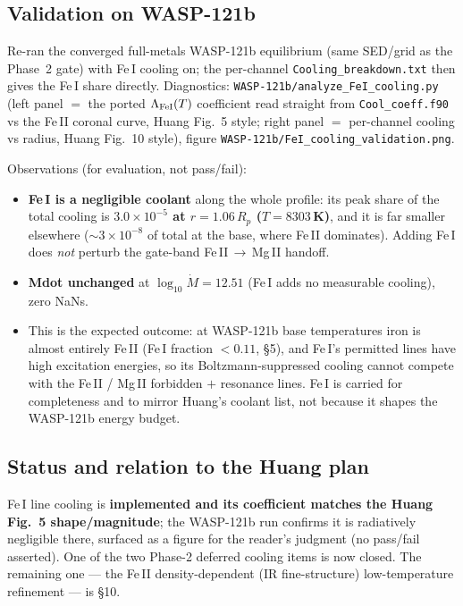 \documentclass[english,a4paper]{kiseon_memo}
\begin{document}
\subsection{Validation on WASP-121b}

Re-ran the converged full-metals WASP-121b equilibrium (same SED/grid as the
Phase~2 gate) with Fe\,I cooling on; the per-channel \texttt{Cooling\_breakdown.txt}
then gives the Fe\,I share directly. Diagnostics:
\texttt{WASP-121b/analyze\_FeI\_cooling.py} (left panel $=$ the ported
\(\Lambda_{\rm FeI}(T)\) coefficient read straight from \texttt{Cool\_coeff.f90} vs
the Fe\,II coronal curve, Huang Fig.~5 style; right panel $=$ per-channel cooling vs
radius, Huang Fig.~10 style), figure
\texttt{WASP-121b/FeI\_cooling\_validation.png}.

Observations (for evaluation, not pass/fail):
\begin{itemize}
  \item \textbf{Fe\,I is a negligible coolant} along the whole profile: its peak
    share of the total cooling is \textbf{\(3.0\times10^{-5}\) at \(r=1.06\,R_p\)
    (\(T=8303\)\,K)}, and it is far smaller elsewhere (\(\sim3\times10^{-8}\) of
    total at the base, where Fe\,II dominates). Adding Fe\,I does \emph{not} perturb
    the gate-band Fe\,II\,\(\to\)\,Mg\,II handoff.
  \item \textbf{Mdot unchanged} at \(\log_{10}\dot M = 12.51\) (Fe\,I adds no
    measurable cooling), zero NaNs.
  \item This is the expected outcome: at WASP-121b base temperatures iron is almost
    entirely Fe\,II (Fe\,I fraction \(<0.11\), \S5), and Fe\,I's permitted lines have
    high excitation energies, so its Boltzmann-suppressed cooling cannot compete with
    the Fe\,II / Mg\,II forbidden $+$ resonance lines. Fe\,I is carried for
    completeness and to mirror Huang's coolant list, not because it shapes the
    WASP-121b energy budget.
\end{itemize}

\subsection{Status and relation to the Huang plan}

Fe\,I line cooling is \textbf{implemented and its coefficient matches the Huang
Fig.~5 shape/magnitude}; the WASP-121b run confirms it is radiatively negligible
there, surfaced as a figure for the reader's judgment (no pass/fail asserted). One
of the two Phase-2 deferred cooling items is now closed. The remaining one --- the
Fe\,II density-dependent (IR fine-structure) low-temperature refinement --- is \S10.
\end{document}
